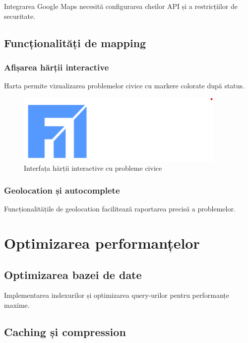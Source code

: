 \documentclass[12pt,a4paper]{report}
\begin{document}
Integrarea Google Maps necesită configurarea cheilor API și a restricțiilor de securitate.

\subsection{Funcționalități de mapping}

\subsubsection{Afișarea hărții interactive}

Harta permite vizualizarea problemelor civice cu markere colorate după status.

\begin{figure}[H]
\centering
\includegraphics[width=0.9\textwidth]{logo_uaic.png}
\caption{Interfața hărții interactive cu probleme civice}
\label{fig:interactive_map}
\end{figure}

\subsubsection{Geolocation și autocomplete}

Funcționalitățile de geolocation facilitează raportarea precisă a problemelor.

\section{Optimizarea performanțelor}

\subsection{Optimizarea bazei de date}

Implementarea indexurilor și optimizarea query-urilor pentru performanțe maxime.

\subsection{Caching și compression}
\end{document}
